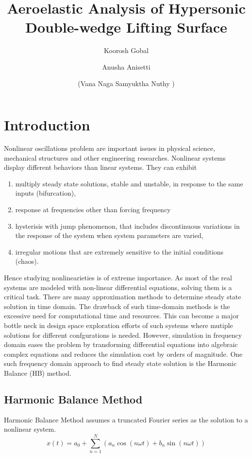\documentclass[12pt, a4paper]{extarticle}
\title{Aeroelastic Analysis of Hypersonic Double-wedge Lifting Surface}
\author[1]{Koorosh Gobal}
\author[1]{Anusha Anisetti}
\author[1]{(Vana Naga Samyuktha Nuthy )}
\affil[1]{Department of Mechanical and Materials Engineering, Wright State University}
\date{} %
\begin{document}
\maketitle

\abstract{}
\section{Introduction}
{Nonlinear oscillations problem are important issues in physical science, mechanical structures and other engineering researches. Nonlinear systems display different behaviors than linear systems. They can exhibit
\begin{enumerate}  
\item  multiply steady state solutions, stable and unstable, in response to the same inputs (bifurcation),
\item  response at frequencies other than forcing frequency
\item  hysterisis with jump phenomenon, that includes discontinuous variations in the response of the system when system parameters are varied,
\item  irregular motions that are extremely sensitive to the initial conditions (chaos).
\end{enumerate}

Hence studying nonlinearieties is of extreme importance. As most of the real systems are modeled with non-linear differential equations, solving them is a critical task. There are many approximation methods to determine steady state solution in time domain. The drawback of such time-domain methods is the excessive need for computational time and resources. This can become a major bottle neck in design space exploration efforts of such systems where mutiple solutions
for different confgurations is needed. However, simulation in frequency domain eases the problem by transforming differential equations into algebraic complex equations and reduces the simulation cost by orders of magnitude. One such frequency domain approach to find steady state solution is the Harmonic Balance (HB) method.
\subsection{Harmonic Balance Method}
{Harmonic Balance Method assumes a truncated Fourier series as the solution to a nonlinear system. 
\begin{equation}
x(t) = a_0+\sum\limits_{n=1}^N (a_n \cos(n\omega t)+b_n \sin(n \omega t))
\end{equation}

}}
\end{document}
